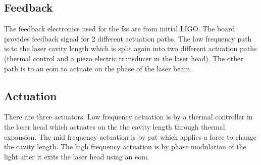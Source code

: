 \subsection{Feedback}
The feedback electronics used for the \ac{fss} are from initial LIGO. The board
provides feedback signal for 2 different actuation paths. The low frequency path
is to the laser cavity length which is split again into two different actuation
paths (thermal control and a piezo electric transducer in the laser head). The
other path is to an \ac{eom} to actuate on the phase of the laser beam.

\subsection{Actuation}

There are three actuators. Low frequency actuation is by a thermal controller in
the laser head which actuates on the the cavity length through thermal expansion.
The mid frequency actuation is by \ac{pzt} which applies a force to change the
cavity length. The high frequency actuation is by phase modulation of the light
after it exits the laser head using an \ac{eom}.


%







